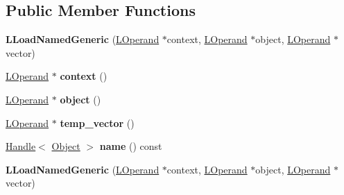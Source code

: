 \subsection*{Public Member Functions}
\begin{DoxyCompactItemize}
\item 
{\bfseries L\+Load\+Named\+Generic} (\hyperlink{classv8_1_1internal_1_1_l_operand}{L\+Operand} $\ast$context, \hyperlink{classv8_1_1internal_1_1_l_operand}{L\+Operand} $\ast$object, \hyperlink{classv8_1_1internal_1_1_l_operand}{L\+Operand} $\ast$vector)\hypertarget{classv8_1_1internal_1_1_l_load_named_generic_a6994bc2c7c479c721ec11114ed19423c}{}\label{classv8_1_1internal_1_1_l_load_named_generic_a6994bc2c7c479c721ec11114ed19423c}

\item 
\hyperlink{classv8_1_1internal_1_1_l_operand}{L\+Operand} $\ast$ {\bfseries context} ()\hypertarget{classv8_1_1internal_1_1_l_load_named_generic_a61d03d8bff411819ec103caee4b20d95}{}\label{classv8_1_1internal_1_1_l_load_named_generic_a61d03d8bff411819ec103caee4b20d95}

\item 
\hyperlink{classv8_1_1internal_1_1_l_operand}{L\+Operand} $\ast$ {\bfseries object} ()\hypertarget{classv8_1_1internal_1_1_l_load_named_generic_ac545174d6ce0223254278aa25992bcf1}{}\label{classv8_1_1internal_1_1_l_load_named_generic_ac545174d6ce0223254278aa25992bcf1}

\item 
\hyperlink{classv8_1_1internal_1_1_l_operand}{L\+Operand} $\ast$ {\bfseries temp\+\_\+vector} ()\hypertarget{classv8_1_1internal_1_1_l_load_named_generic_ac71e90a4f4d755276a1d76ac24d4ef3d}{}\label{classv8_1_1internal_1_1_l_load_named_generic_ac71e90a4f4d755276a1d76ac24d4ef3d}

\item 
\hyperlink{classv8_1_1internal_1_1_handle}{Handle}$<$ \hyperlink{classv8_1_1internal_1_1_object}{Object} $>$ {\bfseries name} () const \hypertarget{classv8_1_1internal_1_1_l_load_named_generic_a328fcd03d981c29639521ee005f3adc7}{}\label{classv8_1_1internal_1_1_l_load_named_generic_a328fcd03d981c29639521ee005f3adc7}

\item 
{\bfseries L\+Load\+Named\+Generic} (\hyperlink{classv8_1_1internal_1_1_l_operand}{L\+Operand} $\ast$context, \hyperlink{classv8_1_1internal_1_1_l_operand}{L\+Operand} $\ast$object, \hyperlink{classv8_1_1internal_1_1_l_operand}{L\+Operand} $\ast$vector)\hypertarget{classv8_1_1internal_1_1_l_load_named_generic_a6994bc2c7c479c721ec11114ed19423c}{}\label{classv8_1_1internal_1_1_l_load_named_generic_a6994bc2c7c479c721ec11114ed19423c}


\end{DoxyCompactItemize}

